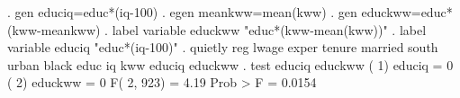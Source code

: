 . gen educiq=educ*(iq-100)
{\smallskip}
. egen meankww=mean(kww)
{\smallskip}
. gen educkww=educ*(kww-meankww)
{\smallskip}
. label variable educkww "educ*(kww-mean(kww))"
{\smallskip}
. label variable educiq "educ*(iq-100)"
{\smallskip}
. quietly reg lwage exper tenure married south urban black educ iq kww educiq educkww
{\smallskip}
. test educiq educkww
{\smallskip}
 ( 1)  educiq = 0
 ( 2)  educkww = 0
{\smallskip}
       F(  2,   923) =    4.19
            Prob > F =    0.0154
{\smallskip}
